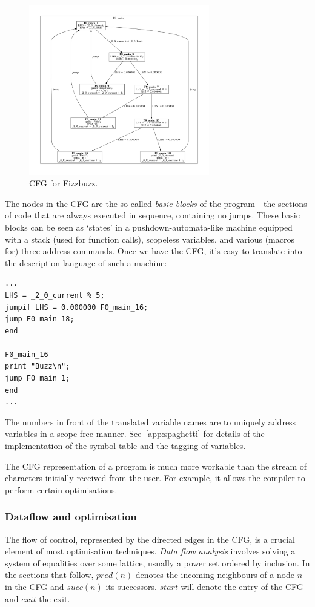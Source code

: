 \documentclass[12pt,a4paper]{article}
\begin{document}
\begin{enumerate}
\begin{figure}[H]
\centering
\includegraphics[width=0.7\textwidth]{images/fizzcfg}
\vspace{-1cm}
\caption{CFG for Fizzbuzz.}
\end{figure}

The nodes in the CFG are the so-called \textit{basic blocks} of the program - the sections of code that are always executed in sequence, containing no jumps.
These basic blocks can be seen as `states' in a pushdown-automata-like machine equipped with a stack (used for function calls), scopeless variables, and various (macros for) three address commands. Once we have the CFG, it's easy to translate into the description language of such a machine:

\begin{verbatim}
...
LHS = _2_0_current % 5;
jumpif LHS = 0.000000 F0_main_16;
jump F0_main_18;
end

F0_main_16
print "Buzz\n";
jump F0_main_1;
end
...
\end{verbatim}

The numbers in front of the translated variable names are to uniquely address variables in a scope free manner. See~\cref{app:spaghetti} for details of the implementation of the symbol table and the tagging of variables.

The CFG representation of a program is much more workable than the stream of characters initially received from the user. For example, it allows the compiler to perform certain optimisations.

\subsubsection{Dataflow and optimisation}
The flow of control, represented by the directed edges in the CFG, is a crucial element of most optimisation techniques. \textit{Data flow analysis} involves solving a system of equalities over some lattice, usually a power set ordered by inclusion. In the sections that follow,
$pred(n)$ denotes the incoming neighbours of a node $n$ in the CFG and $succ(n)$ its successors. $start$ will denote the entry of the CFG and $exit$ the exit.

\end{enumerate}
\end{document}
